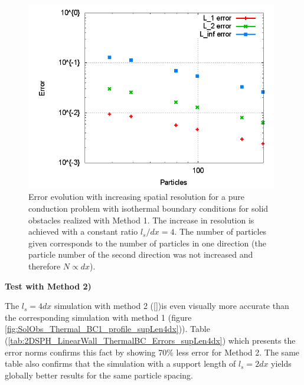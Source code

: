 \documentclass{report}
\begin{document}


\begin{figure}[!htbp]
\centering
\label{fig:SolObs_Thermal_BC1_ResolutionError}

\includegraphics[width=11cm]{Graphics/results/Porosities/LinearWall/ThermalBC1_Resolution/ErrorResolution}

\caption[Error resolution ]{Error evolution with increasing spatial resolution for a pure conduction problem with isothermal boundary conditions for solid obstacles realized with Method 1. The increase in resolution is achieved with a constant ratio $l_s/dx=4$.
The number of particles given corresponds to the number of particles in one direction (the particle number of the second direction was not increased and therefore $N \propto dx$). }

\end{figure}
\vspace{1cm}
{\bf Test with Method 2) } 
\linebreak[2]


The $l_s=4dx$ simulation with method 2 (\ref{})is even visually more accurate than the corresponding simulation with method 1 (figure \ref{fig:SolObs_Thermal_BC1_profile_supLen4dx})). Table (\ref{tab:2DSPH_LinearWall_ThermalBC_Errors_supLen4dx}) which presents the error norms confirms this fact by showing 70\% less error for Method 2. The same table also confirms that the simulation with a support length of $l_s=2dx$ yields globally better results for the same particle spacing.
\end{document}
